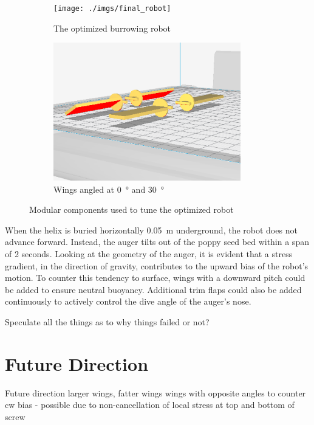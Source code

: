 \documentclass[letterpaper, 11 pt]{article}
\begin{document}
\begin{figure}[H]
\centering
\begin{subfigure}{.5\textwidth}
	\centering
	\texttt{[image: ./imgs/final\_robot]}
	\caption{The optimized burrowing robot}
	\label{fig:final_robot}
\end{subfigure}%
\begin{subfigure}{.5\textwidth}
	\centering
	\includegraphics[height=6cm]{./imgs/wings}
	\caption{Wings angled at \SI{0}{\degree} and \SI{30}{\degree}}
	\label{fig:wings}
\end{subfigure}
\caption{Modular components used to tune the optimized robot}
\label{fig:final_testing}
\end{figure} 

When the helix is buried horizontally \SI{0.05}{\m} underground, the robot does not advance forward. Instead, the auger tilts out of the poppy seed bed within a span of 2 seconds. Looking at the geometry of the auger, it is evident that a stress gradient, in the direction of gravity, contributes to the upward bias of the robot's motion. To counter this tendency to surface, wings with a downward pitch could be added to ensure neutral buoyancy. Additional trim flaps could also be added continuously to actively control the dive angle of the auger's nose. 
 
Speculate all the things as to why things failed or not?

\section{Future Direction}
Future direction
larger wings, fatter wings
wings with opposite angles to counter cw bias - possible due to non-cancellation of local stress at top and bottom of screw 





\end{document}
